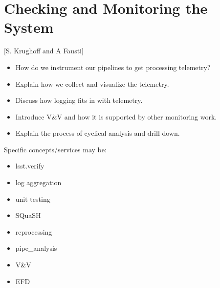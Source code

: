 \section{Checking and Monitoring the System} [S. Krughoff and A Fausti]
\begin{itemize}
\item How do we instrument our pipelines to get processing telemetry?
\item Explain how we collect and visualize the telemetry.
\item Discuss how logging fits in with telemetry.
\item Introduce V\&V and how it is supported by other monitoring work.
\item Explain the process of cyclical analysis and drill down.
\end{itemize}

Specific concepts/services may be:
\begin{itemize}
\item lsst.verify
\item log aggregation
\item unit testing
\item SQuaSH
\item reprocessing
\item pipe\_analysis
\item V\&V
\item EFD
\end{itemize}
